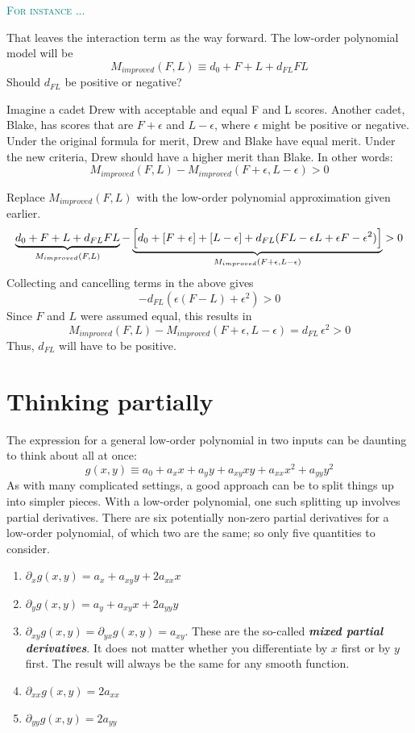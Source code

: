 \documentclass[
  letterpaper,
  DIV=11,
  numbers=noendperiod,
  oneside]{scrreprt}
\providecommand{\tightlist}{%
  \setlength{\itemsep}{0pt}\setlength{\parskip}{0pt}}
\newenvironment{example}%
{%
\textcolor{teal}{\hrulefill}%
  \par\vspace{.3\baselineskip}%
  \textcolor{teal}{\scshape For instance ...}%
  \par\vspace{\baselineskip}%
}%
{\textcolor{teal}{\hrulefill}}
\begin{document}
\begin{example}
That leaves the interaction term as the way forward. The low-order
polynomial model will be
\[M_{improved}(F, L) \equiv d_0 + F + L + d_{FL} FL\] Should \(d_{FL}\)
be positive or negative?

Imagine a cadet Drew with acceptable and equal F and L scores. Another
cadet, Blake, has scores that are \(F+\epsilon\) and \(L-\epsilon\),
where \(\epsilon\) might be positive or negative. Under the original
formula for merit, Drew and Blake have equal merit. Under the new
criteria, Drew should have a higher merit than Blake. In other words:
\[M_{improved}(F, L) - M_{improved}(F+\epsilon, L-\epsilon) > 0\]

Replace \(M_{improved}(F, L)\) with the low-order polynomial
approximation given earlier.
\[\underbrace{d_0 + F + L + d_{FL} FL}_{M_{improved}(F, L)} - \underbrace{\left[{\large\strut} d_0 + \left[ F + \epsilon\right] + \left[ L - \epsilon\right] + d_{FL} (FL -\epsilon L + \epsilon F -  \epsilon^2)\right]}_{M_{improved}(F+\epsilon, L-\epsilon)} > 0\]
Collecting and cancelling terms in the above gives
\[- d_{FL}(\epsilon(F-L) + \epsilon^2) > 0\] Since \(F\) and \(L\) were
assumed equal, this results in
\[M_{improved}(F, L) - M_{improved}(F+\epsilon, L-\epsilon) = d_{FL}\, \epsilon^2 > 0\]
Thus, \(d_{FL}\) will have to be positive.

\end{example}

\hypertarget{sec-partial-thought}{%
\section{Thinking partially}\label{sec-partial-thought}}

The expression for a general low-order polynomial in two inputs can be
daunting to think about all at once:
\[g(x, y) \equiv a_0 + a_x x + a_y y + a_{xy} x y + a_{xx} x^2 + a_{yy} y^2\]
As with many complicated settings, a good approach can be to split
things up into simpler pieces. With a low-order polynomial, one such
splitting up involves partial derivatives. There are six potentially
non-zero partial derivatives for a low-order polynomial, of which two
are the same; so only five quantities to consider.

\begin{enumerate}
\def\labelenumi{\arabic{enumi}.}
\tightlist
\item
  \(\partial_x g(x,y) = a_x + a_{xy}y + 2 a_{xx} x\)
\item
  \(\partial_y g(x,y) = a_y + a_{xy}x + 2 a_{yy} y\)
\item
  \(\partial_{xy} g(x,y) = \partial_{yx} g(x,y) = a_{xy}\). These are
  the so-called \textbf{\emph{mixed partial derivatives}}. It does not
  matter whether you differentiate by \(x\) first or by \(y\) first. The
  result will always be the same for any smooth function.
\item
  \(\partial_{xx} g(x,y) = 2 a_{xx}\)
\item
  \(\partial_{yy} g(x,y) = 2 a_{yy}\)
\end{enumerate}
\end{document}
